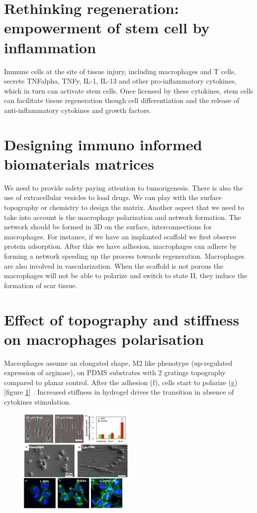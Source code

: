 \section{Rethinking regeneration: empowerment of stem cell by inflammation}
Immune cells at the site of tissue injury, including macrophages and T cells, secrete TNFalpha, TNFy, IL-1, IL-13 and other pro-inflammatory cytokines, which in turn can activate stem cells.
Once licensed by these cytokines, stem cells can facilitate tissue regeneration though cell differentiation and the release of anti-inflammatory cytokines and growth factors.

\section{Designing immuno informed biomaterials matrices}
We need to provide safety paying attention to tumorigenesis.
There is also the use of extracellular vesicles to load drugs.
We can play with the surface topography or chemistry to design the matrix.
Another aspect that we need to take into account is the macrophage polarization and network formation.
The network should be formed in 3D on the surface, interconnections for macrophages.
For instance, if we have an implanted scaffold we first observe protein adsorption.
After this we have adhesion, macrophages can adhere by forming a network speeding up the process towards regeneration.
Macrophages are also involved in vascularization.
When the scaffold is not porous the macrophages will not be able to polarize and switch to state II, they induce the formation of scar tissue.

\section{Effect of topography and stiffness on macrophages polarisation}
Macrophages assume an elongated shape, M2 like phenotype (up-regulated expression of arginase), on PDMS substrates with 2 gratings topography compared to planar control.
After the adhesion (f), cells start to polarize (g) [figure \ref{fig:topo}] .  Increased stiffness in hydrogel drives the transition in absence of cytokines stimulation.

\begin{figure}[ht]
\centering
\includegraphics[width=0.5\textwidth]{topo}
\caption{\label{fig:topo}}
\end{figure}

